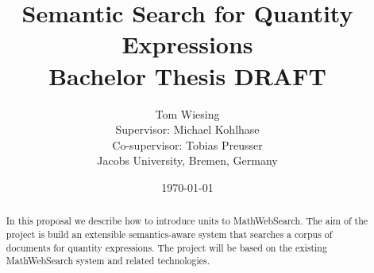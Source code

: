 \documentclass[11pt]{article}
\title{Semantic Search for Quantity Expressions\\ \vspace{2 mm} Bachelor Thesis DRAFT\ednote{Remove draft status}}
\author{Tom Wiesing\\Supervisor: Michael Kohlhase\\Co-supervisor: Tobias Preusser\\Jacobs University, Bremen, Germany}
\date{\today}
\begin{document}
\maketitle

\begin{abstract}
  In this proposal we describe how to introduce units to MathWebSearch. The aim of the project is build an extensible semantics-aware system that searches a corpus of documents for quantity expressions. The project will be based on the existing MathWebSearch system and related technologies. 
\end{abstract}

\newpage

\tableofcontents

\newpage



\newpage



\newpage



\newpage



\newpage



\newpage



\newpage

{}
\end{document}
